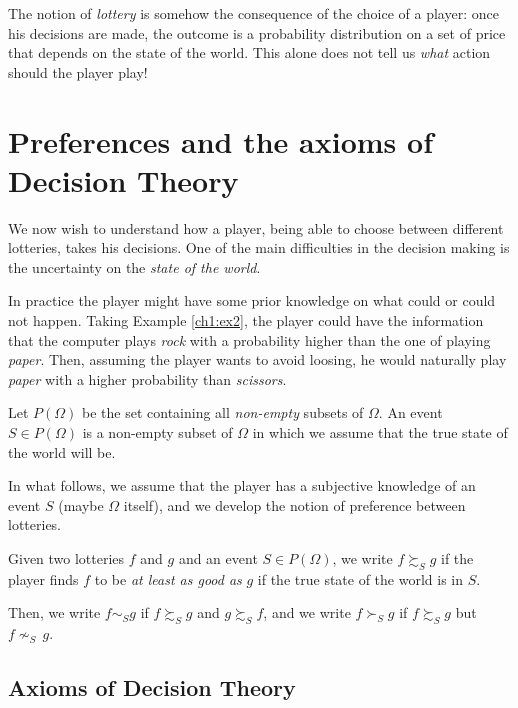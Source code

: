 The notion of \emph{lottery} is somehow the consequence of the choice of a player: once his decisions are made, the outcome is a probability distribution on a set of price that depends on the state of the world. 
This alone does not tell us \emph{what} action should the player play!

\section{Preferences and the axioms of Decision Theory}

We now wish to understand how a player, being able to choose between different lotteries, takes his decisions. One of the main difficulties in the decision making is the uncertainty on the \emph{state of the world}. 

In practice the player might have some prior knowledge on what could or could not happen. Taking Example \ref{ch1:ex2}, the player could have the information that the computer plays \emph{rock} with a probability higher than the one of playing \emph{paper}. Then, assuming the player wants to avoid loosing, he would naturally play \emph{paper} with a higher probability than  \emph{scissors}.

\begin{definition}
Let $P(\Omega)$ be the set containing all \emph{non-empty} subsets of $\Omega$.
An event $S \in P(\Omega)$ is a non-empty subset of $ \Omega $ in which we assume that the true state of the world will be.
\end{definition}

In what follows, we assume that the player has a subjective knowledge of an event $S$ (maybe $\Omega$ itself), and we develop the notion of preference between lotteries.

\begin{notation}
Given two lotteries $f$ and $g$ and an event $S \in P(\Omega)$, 
we write $f \succsim_S g$ if the player finds $f$ to be \emph{at least as good as} $g$ if the true state of the world is in $S$. 

Then, we write $ f \sim_S g $ if $ f \succsim_S g$ and $g \succsim_S f$, and we write  $f \succ_S g$ if $f \succsim_S g$ but $f  {\nsim}_S \, g$.
\end{notation}


\subsection{Axioms of Decision Theory}

